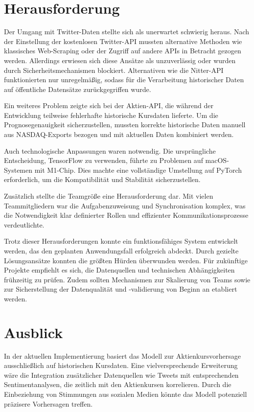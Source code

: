 \documentclass[conference,a4paper,flushend]{cs-techrep}
\begin{document}
\section{Herausforderung}
Der Umgang mit Twitter-Daten stellte sich als unerwartet schwierig heraus. Nach der Einstellung der kostenlosen Twitter-API mussten alternative Methoden wie klassisches Web-Scraping oder der Zugriff auf andere APIs in Betracht gezogen werden. Allerdings erwiesen sich diese Ansätze als unzuverlässig oder wurden durch Sicherheitsmechanismen blockiert. Alternativen wie die Nitter-API funktionierten nur unregelmäßig, sodass für die Verarbeitung historischer Daten auf öffentliche Datensätze zurückgegriffen wurde.

Ein weiteres Problem zeigte sich bei der Aktien-API, die während der Entwicklung teilweise fehlerhafte historische Kursdaten lieferte. Um die Prognosegenauigkeit sicherzustellen, mussten korrekte historische Daten manuell aus NASDAQ-Exports bezogen und mit aktuellen Daten kombiniert werden.

Auch technologische Anpassungen waren notwendig. Die ursprüngliche Entscheidung, TensorFlow zu verwenden, führte zu Problemen auf macOS-Systemen mit M1-Chip. Dies machte eine vollständige Umstellung auf PyTorch erforderlich, um die Kompatibilität und Stabilität sicherzustellen.

Zusätzlich stellte die Teamgröße eine Herausforderung dar. Mit vielen Teammitgliedern war die Aufgabenzuweisung und Synchronisation komplex, was die Notwendigkeit klar definierter Rollen und effizienter Kommunikationsprozesse verdeutlichte.

Trotz dieser Herausforderungen konnte ein funktionsfähiges System entwickelt werden, das den geplanten Anwendungsfall erfolgreich abdeckt. Durch gezielte Lösungsansätze konnten die größten Hürden überwunden werden. Für zukünftige Projekte empfiehlt es sich, die Datenquellen und technischen Abhängigkeiten frühzeitig zu prüfen. Zudem sollten Mechanismen zur Skalierung von Teams sowie zur Sicherstellung der Datenqualität und -validierung von Beginn an etabliert werden.


\section{Ausblick}
In der aktuellen Implementierung basiert das Modell zur Aktienkursvorhersage ausschließlich auf historischen Kursdaten. Eine vielversprechende Erweiterung wäre die Integration zusätzlicher Datenquellen wie Tweets mit entsprechenden Sentimentanalysen, die zeitlich mit den Aktienkursen korrelieren. Durch die Einbeziehung von Stimmungen aus sozialen Medien könnte das Modell potenziell präzisere Vorhersagen treffen.
\end{document}
